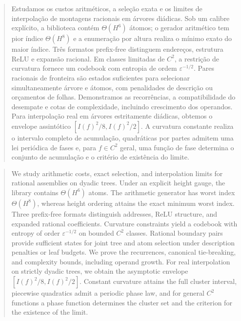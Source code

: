 

\renewcommand{\abstractname}{Resumo}
\begin{abstract}Estudamos os custos aritméticos, a seleção exata e os limites de interpolação de montagens racionais em árvores diádicas. Sob um calibre explícito, a biblioteca contém $\Theta(H^6)$ átomos; o gerador aritmético tem pior índice $\Theta(H^8)$ e a enumeração por altura realiza o mínimo exato do maior índice. Três formatos prefix-free distinguem endereços, estrutura ReLU e expansão racional. Em classes limitadas de $C^2$, a restrição de curvatura fornece um codebook com entropia de ordem $\varepsilon^{-1/2}$. Pares racionais de fronteira são estados suficientes para selecionar simultaneamente árvore e átomos, com penalidades de descrição ou orçamentos de folhas. Demonstramos as recorrências, a compatibilidade do desempate e cotas de complexidade, incluindo crescimento dos operandos. Para interpolação real em árvores estritamente diádicas, obtemos o envelope assintótico $[I(f)^2/8,\allowbreak I(f)^2/2]$. A curvatura constante realiza o intervalo completo de acumulação, quadráticas por partes admitem uma lei periódica de fases e, para $f\in C^2$ geral, uma função de fase determina o conjunto de acumulação e o critério de existência do limite.\end{abstract}
\renewcommand{\abstractname}{Abstract}
\begin{abstract}We study arithmetic costs, exact selection, and interpolation limits for rational assemblies on dyadic trees. Under an explicit height gauge, the library contains $\Theta(H^6)$ atoms. The arithmetic generator has worst index $\Theta(H^8)$, whereas height ordering attains the exact minimum worst index. Three prefix-free formats distinguish addresses, ReLU structure, and expanded rational coefficients. Curvature constraints yield a codebook with entropy of order $\varepsilon^{-1/2}$ on bounded $C^2$ classes. Rational boundary pairs provide sufficient states for joint tree and atom selection under description penalties or leaf budgets. We prove the recurrences, canonical tie-breaking, and complexity bounds, including operand growth. For real interpolation on strictly dyadic trees, we obtain the asymptotic envelope $[I(f)^2/8,\allowbreak I(f)^2/2]$. Constant curvature attains the full cluster interval, piecewise quadratics admit a periodic phase law, and for general $C^2$ functions a phase function determines the cluster set and the criterion for the existence of the limit.\end{abstract}
\renewcommand{\abstractname}{Resumo}
